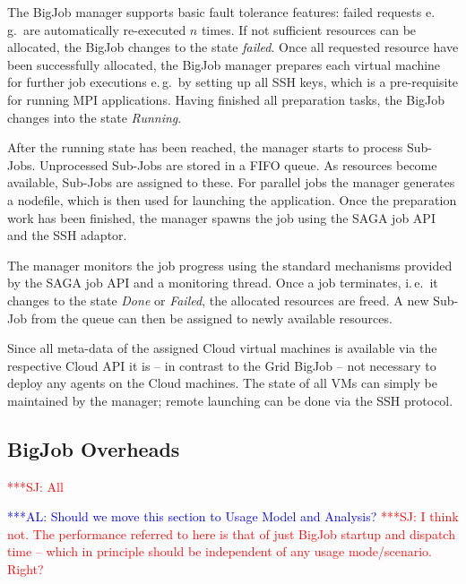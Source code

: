 \documentclass[conference,final]{IEEEtran}
\newcommand{\alnote}[1]{ {\textcolor{blue} { ***AL: #1 }}}
\newcommand{\jhanote}[1]{ {\textcolor{red} { ***SJ: #1 }}}
\newcommand{\alnote}[1]{}
\newcommand{\jhanote}[1]{}
\begin{document}
The BigJob manager supports basic fault tolerance features: failed requests e.\,g.\
are automatically re-executed $n$ times. If not sufficient resources can be
allocated, the BigJob changes to the state \emph{failed}.
Once all requested resource have been successfully allocated, the BigJob manager
prepares each virtual machine for further job executions e.\,g.\ by setting
up all SSH keys, which is a pre-requisite for running MPI applications.
Having finished all preparation tasks, the BigJob changes into the state
\emph{Running}. 

After the running state has been reached, the manager starts to process Sub-Jobs.
Unprocessed Sub-Jobs are stored in a FIFO queue. As resources become available,
Sub-Jobs are assigned to these. For parallel jobs the manager generates
a nodefile, which is then used for launching the application. Once the preparation
work has been finished, the manager spawns the job using the SAGA job API and the SSH
adaptor. 

The manager monitors the job progress using the standard mechanisms provided by the
SAGA job API and a monitoring thread. Once a job terminates, i.\,e.\ it changes 
to the state \emph{Done} or \emph{Failed}, the allocated resources are freed. 
A new Sub-Job from the queue can then be assigned to newly available resources.

Since all meta-data of the assigned Cloud virtual machines is available via 
the respective Cloud API it is -- in contrast to the Grid BigJob -- not necessary 
to deploy any agents on the Cloud machines. The state of all VMs can simply be 
maintained by the manager; remote launching can be done via the SSH protocol.


\subsection{BigJob Overheads} \jhanote{All}

\alnote{Should we move this section to Usage Model and Analysis?}
\jhanote{I think not. The performance referred to here is that of just
  BigJob startup and dispatch time -- which in principle should be
  independent of any usage mode/scenario. Right?}
\end{document}
